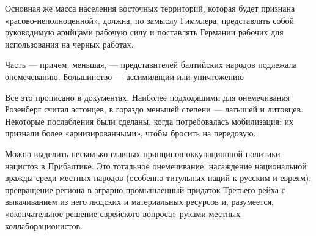 Основная же масса населения восточных территорий, которая будет признана
«расово-неполноценной», должна, по замыслу Гиммлера, представлять собой
руководимую арийцами рабочую силу и поставлять Германии рабочих для
использования на черных работах.

\begin{leftbar}
	\large
	Часть — причем, меньшая, — представителей балтийских народов подлежала
				онемечеванию. Большинство — ассимиляции или уничтожению
\end{leftbar}

Все это прописано в документах. Наиболее подходящими для онемечивания Розенберг
считал эстонцев, в гораздо меньшей степени — латышей и литовцев. Некоторые
послабления были сделаны, когда потребовалась мобилизация: их признали более
«ариизированными», чтобы бросить на передовую.

Можно выделить несколько главных принципов оккупационной политики нацистов в
Прибалтике. Это тотальное онемечивание, насаждение национальной вражды среди
местных народов (особенно титульных наций к русским и евреям), превращение
региона в аграрно-промышленный придаток Третьего рейха с выкачиванием из него
людских и материальных ресурсов и, разумеется, «окончательное решение
еврейского вопроса» руками местных коллаборационистов.

